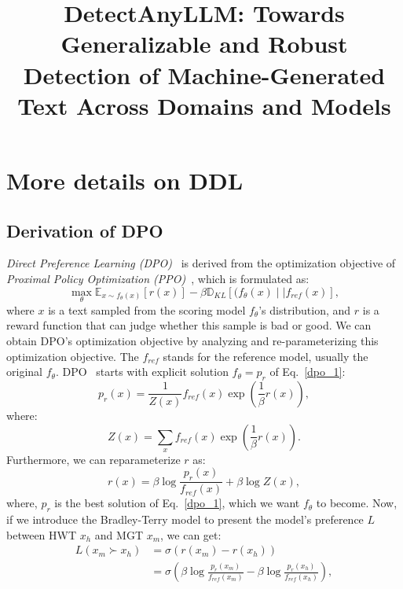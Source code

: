 \documentclass[sigconf, screen, review, anonymous]{acmart}
\begin{document}
\title{DetectAnyLLM: Towards Generalizable and Robust Detection of Machine-Generated Text Across Domains and Models}
\maketitle

\appendix

\section{More details on DDL}
\subsection{Derivation of DPO}
\textit{Direct Preference Learning (DPO)}~\cite{dpo} is derived from the optimization objective of \textit{Proximal Policy Optimization (PPO)}~\cite{ppo}, which is formulated as:
\begin{equation}
    \mathop{max}_\theta \mathbb{E}_{x\sim f_\theta(x)}[r(x)] - \beta\mathbb{D}_{KL}[(f_\theta(x) \mid \mid f_{ref}(x)],
    \label{dpo_1}
\end{equation}
where $x$ is a text sampled from the scoring model $f_\theta$'s distribution, and $r$ is a reward function that can judge whether this sample is bad or good.
%
We can obtain DPO's optimization objective by analyzing and re-parameterizing this optimization objective.
%
The $f_{ref}$ stands for the reference model, usually the original $f_\theta$.
%
DPO~\cite{dpo} starts with explicit solution $f_\theta=p_r$ of Eq.~\eqref{dpo_1}:
\begin{equation}
    p_r(x) = \frac{1}{Z(x)}f_{ref}(x)\exp(\frac{1}{\beta}r(x)),
    \label{dpo_2}
\end{equation}
where:
\begin{equation}
    Z(x) = \sum_{x}f_{ref}(x)\exp (\frac{1}{\beta}r(x)).
    \label{dpo_3}
\end{equation}
Furthermore, we can reparameterize $r$ as:
\begin{equation}
    r(x) = \beta\log \frac{p_r(x)}{f_{ref}(x)} + \beta\log Z(x),
    \label{dpo_4}
\end{equation}
where, $p_r$ is the best solution of Eq.~\eqref{dpo_1}, which we want $f_\theta$ to become.
%
Now, if we introduce the Bradley-Terry model to present the model's preference $L$ between HWT $x_h$ and MGT $x_m$, we can get:
\begin{equation}
\begin{aligned}
    L(x_m \succ x_h) &= \sigma(r(x_m) - r(x_h))\\
    &=\sigma(\beta\log\frac{p_r(x_m)}{f_{ref}(x_m)} - \beta\log\frac{p_r(x_h)}{f_{ref}(x_h)}),
\end{aligned}
\label{dpo_5}
\end{equation}
\end{document}
